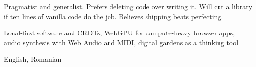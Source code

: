 
{\bodytext Pragmatist and generalist. Prefers deleting code over writing it. Will cut a library if ten lines of vanilla code do the job. Believes shipping beats perfecting.\par}

\vspace{\sidebarsectionsep}

{\bodytext Local-first software and CRDTs, WebGPU for compute-heavy browser apps, audio synthesis with Web Audio and MIDI, digital gardens as a thinking tool\par}

\vspace{\sidebarsectionsep}

{\bodytext English, Romanian\par}
